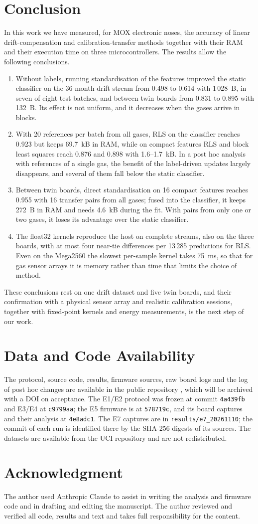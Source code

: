 \documentclass[journal,twoside,web]{ieeecolor}
\begin{document}
\section{Conclusion}
In this work we have measured, for MOX electronic noses, the accuracy of linear drift-compensation and calibration-transfer methods together with their RAM and their execution time on three microcontrollers. The results allow the following conclusions.
\begin{enumerate}
\item Without labels, running standardisation of the features improved the static classifier on the 36-month drift stream from 0.498 to 0.614 with 1\,028~B, in seven of eight test batches, and between twin boards from 0.831 to 0.895 with 132~B. Its effect is not uniform, and it decreases when the gases arrive in blocks.
\item With 20 references per batch from all gases, RLS on the classifier reaches 0.923 but keeps 69.7~kB in RAM, while on compact features RLS and block least squares reach 0.876 and 0.898 with 1.6--1.7~kB. In a post hoc analysis with references of a single gas, the benefit of the label-driven updates largely disappears, and several of them fall below the static classifier.
\item Between twin boards, direct standardisation on 16 compact features reaches 0.955 with 16 transfer pairs from all gases; fused into the classifier, it keeps 272~B in RAM and needs 4.6~kB during the fit. With pairs from only one or two gases, it loses its advantage over the static classifier.
\item The float32 kernels reproduce the host on complete streams, also on the three boards, with at most four near-tie differences per 13\,285 predictions for RLS. Even on the Mega2560 the slowest per-sample kernel takes 75~ms, so that for gas sensor arrays it is memory rather than time that limits the choice of method.
\end{enumerate}
These conclusions rest on one drift dataset and five twin boards, and their confirmation with a physical sensor array and realistic calibration sessions, together with fixed-point kernels and energy measurements, is the next step of our work.

\section*{Data and Code Availability}
The protocol, source code, results, firmware sources, raw board logs and the log of post hoc changes are available in the public repository \cite{code}, which will be archived with a DOI on acceptance. The E1/E2 protocol was frozen at commit \texttt{4a439fb} and E3/E4 at \texttt{c9799aa}; the E5 firmware is at \texttt{578719c}, and its board captures and their analysis at \texttt{4e8adc1}. The E7 captures are in \texttt{results/e7\_20261110}; the commit of each run is identified there by the SHA-256 digests of its sources. The datasets are available from the UCI repository \cite{uci224,uci270,uci361} and are not redistributed.

\section*{Acknowledgment}
The author used Anthropic Claude to assist in writing the analysis and firmware code and in drafting and editing the manuscript. The author reviewed and verified all code, results and text and takes full responsibility for the content.


\end{document}
